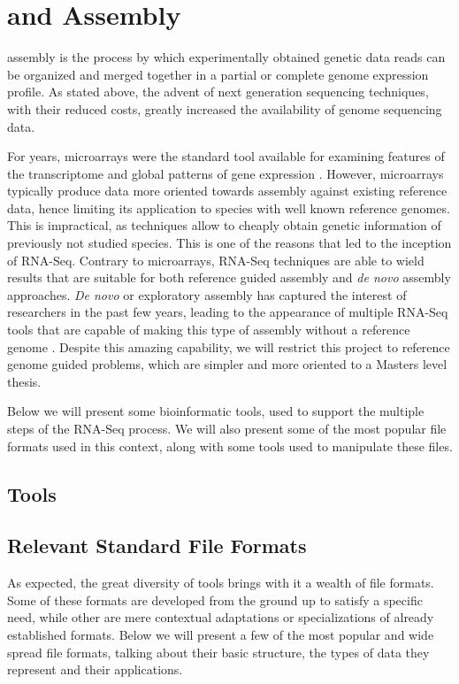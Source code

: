 \section{\rnaseq{} and \Trans{} Assembly}\label{sec:assembly}

\Trans{} assembly is the process by which experimentally obtained genetic data
reads can be organized and merged together in a partial or complete genome
expression profile. As stated above, the advent of next generation sequencing
techniques, with their reduced costs, greatly increased the availability of
genome sequencing data.

For years, microarrays were the standard tool available for examining features
of the transcriptome and global patterns of gene expression \cite{Wolf2013}.
However, microarrays typically produce data more oriented towards assembly
against existing reference data, hence limiting its application to species with
well known reference genomes. This is impractical, as \ngs{} techniques allow to
cheaply obtain genetic information of previously not studied species. This is
one of the reasons that led to the inception of RNA-Seq. Contrary to
microarrays, RNA-Seq techniques are able to wield results that are suitable for
both reference guided assembly and \textit{de novo} assembly approaches.
\textit{De novo} or exploratory assembly has captured the interest of
researchers in the past few years, leading to the appearance of multiple RNA-Seq
tools that are capable of making this type of assembly without a reference
genome \cite{nuno11:assemblathon}. Despite this amazing capability, we will
restrict this project to reference genome guided problems, which are simpler and
more oriented to a Masters level thesis.

Below we will present some bioinformatic tools, used to support the multiple
steps of the RNA-Seq process. We will also present some of the most popular file
formats used in this context, along with some tools used to manipulate these
files.

\subsection{\rnaseq{} Tools}\label{sec:seqtools}

\subsection{Relevant Standard File Formats}\label{sec:formats}

As expected, the great diversity of \rnaseq{} tools brings with it a wealth of
file formats. Some of these formats are developed from the ground up to satisfy
a specific need, while other are mere contextual adaptations or specializations
of already established formats. Below we will present a few of the most popular
and wide spread file formats, talking about their basic structure, the types of
data they represent and their applications.

